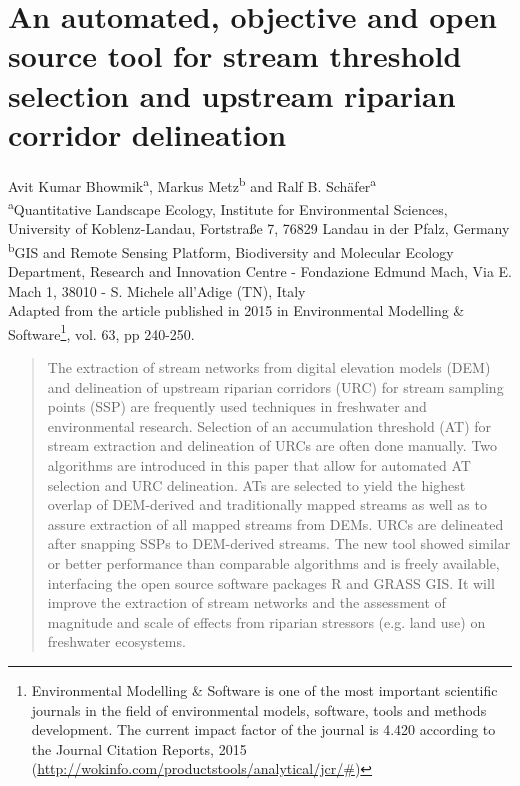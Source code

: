 \chapter{An automated, objective and open source tool for stream threshold selection and upstream riparian corridor delineation}
\label{chapter2}

Avit Kumar Bhowmik\textsuperscript{a}, Markus Metz\textsuperscript{b} and Ralf B. Schäfer\textsuperscript{a}\\[.5cm]
\small
\textsuperscript{a}Quantitative Landscape Ecology, Institute for Environmental Sciences, University of Koblenz-Landau, Fortstraße 7, 76829 Landau in der Pfalz, Germany\\
\textsuperscript{b}GIS and Remote Sensing Platform, Biodiversity and Molecular Ecology Department, Research and Innovation Centre - Fondazione Edmund Mach, Via E. Mach 1, 38010 - S. Michele all’Adige (TN), Italy\\[1cm]
\medskip
\normalsize
Adapted from the article published in 2015 in Environmental Modelling \& Software\footnote{Environmental Modelling \& Software is one of the most important scientific journals in the field of environmental models, software, tools and methods development. The current impact factor of the journal is 4.420 according to the Journal Citation Reports, 2015 (\href{http://wokinfo.com/products_tools/analytical/jcr/#}{http://wokinfo.com/products\textunderscore tools/analytical/jcr/#})}, vol. 63, pp 240-250.\\[.5cm]

\renewcommand{\abstractname}{Abstract}
\begin{abstract}
The extraction of stream networks from digital elevation models (DEM) and delineation of upstream riparian corridors (URC) for stream sampling points (SSP) are frequently used techniques in freshwater and environmental research. Selection of an accumulation threshold (AT) for stream extraction and delineation of URCs are often done manually. Two algorithms are introduced in this paper that allow for automated AT selection and URC delineation. ATs are selected to yield the highest overlap of DEM-derived and traditionally mapped streams as well as to assure extraction of all mapped streams from DEMs. URCs are delineated after snapping SSPs to DEM-derived streams. The new tool showed similar or better performance than comparable algorithms and is freely available, interfacing the open source software packages R and GRASS GIS. It will improve the extraction of stream networks and the assessment of magnitude and scale of effects from riparian stressors (e.g. land use) on freshwater ecosystems. 
\end{abstract}

